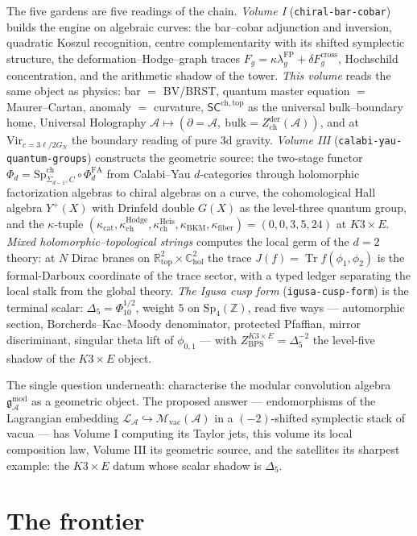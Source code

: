 \documentclass[11pt]{article}
\providecommand{\cA}{\mathcal{A}}
\providecommand{\cL}{\mathcal{L}}
\providecommand{\cM}{\mathcal{M}}
\providecommand{\bC}{\mathbb{C}}
\providecommand{\bR}{\mathbb{R}}
\providecommand{\bZ}{\mathbb{Z}}
\providecommand{\fg}{\mathfrak{g}}
\providecommand{\Vir}{\mathrm{Vir}}
\providecommand{\Zder}{Z^{\mathrm{der}}_{\mathrm{ch}}}
\providecommand{\kch}{\kappa_{\mathrm{ch}}}
\providecommand{\kBKM}{\kappa_{\mathrm{BKM}}}
\providecommand{\kcat}{\kappa_{\mathrm{cat}}}
\providecommand{\kfib}{\kappa_{\mathrm{fiber}}}
\providecommand{\SCchtop}{\mathsf{SC}^{\mathrm{ch,top}}}
\providecommand{\PhiFA}{\Phi^{\mathrm{FA}}}
\providecommand{\SpCh}{\mathrm{Sp}^{\mathrm{ch}}}
\providecommand{\Dfive}{\Delta_5}
\providecommand{\Phiten}{\Phi_{10}}
\providecommand{\Tr}{\operatorname{Tr}}
\begin{document}
The five gardens are five readings of the chain. \emph{Volume I}
(\texttt{chiral-bar-cobar}) builds the engine on algebraic curves: the
bar--cobar adjunction and inversion, quadratic Koszul recognition,
centre complementarity with its shifted symplectic structure, the
deformation--Hodge--graph traces
$F_g=\kappa\lambda^{\mathrm{FP}}_g+\delta F^{\mathrm{cross}}_g$,
Hochschild concentration, and the arithmetic shadow of the tower.
\emph{This volume} reads the same object as physics: bar $=$ BV/BRST,
quantum master equation $=$ Maurer--Cartan, anomaly $=$ curvature,
$\SCchtop$ as the universal bulk--boundary home, Universal Holography
$\cA\mapsto(\partial=\cA,\ \mathrm{bulk}=\Zder(\cA))$, and at
$\Vir_{c=3\ell/2G_N}$ the boundary reading of pure 3d gravity.
\emph{Volume III} (\texttt{calabi-yau-quantum-groups}) constructs the
geometric source: the two-stage functor
$\Phi_d=\SpCh_{\Sigma_{d-1},C}\circ\PhiFA_d$ from Calabi--Yau
$d$-categories through holomorphic factorization algebras to chiral
algebras on a curve, the cohomological Hall algebra $Y^+(X)$ with
Drinfeld double $G(X)$ as the level-three quantum group, and the
$\kappa$-tuple $(\kcat,\kch^{\mathrm{Hodge}},\kch^{\mathrm{Heis}},
\kBKM,\kfib)=(0,0,3,5,24)$ at $K3\times E$.
\emph{Mixed holomorphic--topological strings} computes the local germ
of the $d=2$ theory: at $N$ Dirac branes on
$\bR^2_{\mathrm{top}}\times\bC^2_{\mathrm{hol}}$ the trace
$J(f)=\Tr f(\phi_1,\phi_2)$ is the formal-Darboux coordinate of the
trace sector, with a typed ledger separating the local stalk from the
global theory. \emph{The Igusa cusp form} (\texttt{igusa-cusp-form})
is the terminal scalar: $\Dfive=\Phiten^{1/2}$, weight $5$ on
$\mathrm{Sp}_4(\bZ)$, read five ways --- automorphic section,
Borcherds--Kac--Moody denominator, protected Pfaffian, mirror
discriminant, singular theta lift of $\phi_{0,1}$ --- with
$Z^{K3\times E}_{\mathrm{BPS}}=\Dfive^{-2}$ the level-five shadow of
the $K3\times E$ object.

The single question underneath: characterise the modular convolution
algebra $\fg^{\mathrm{mod}}_\cA$ as a geometric object. The proposed
answer --- endomorphisms of the Lagrangian embedding
$\cL_\cA\hookrightarrow\cM_{\mathrm{vac}}(\cA)$ in a $(-2)$-shifted
symplectic stack of vacua --- has Volume I computing its Taylor jets,
this volume its local composition law, Volume III its geometric
source, and the satellites its sharpest example: the $K3\times E$
datum whose scalar shadow is $\Dfive$.

\section{The frontier}\label{sec:frontier}
\end{document}

